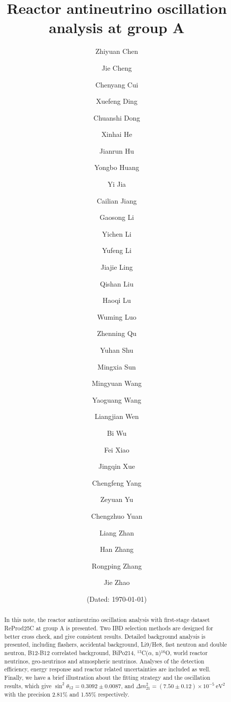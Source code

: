 \documentclass[12pt]{article}
\begin{document}
\linenumbers

\title{\textbf{Reactor antineutrino oscillation analysis at group A}}
\author[1]{Zhiyuan Chen}
\author[2]{Jie Cheng}
\author[1]{Chenyang Cui}
\author[1]{Xuefeng Ding}
\author[1]{Chuanshi Dong}
\author[1]{Xinhai He}
\author[3]{Jianrun Hu}
\author[4]{Yongbo Huang}
\author[1]{Yi Jia}
\author[1,5]{Cailian Jiang}
\author[1]{Gaosong Li}
\author[1]{Yichen Li}
\author[1]{Yufeng Li}
\author[3]{Jiajie Ling}
\author[1]{Qishan Liu}
\author[1]{Haoqi Lu}
\author[1]{Wuming Luo}
\author[1]{Zhenning Qu}
\author[1]{Yuhan Shu}
\author[1]{Mingxia Sun}
\author[1]{Mingyuan Wang}
\author[6]{Yaoguang Wang}
\author[1]{Liangjian Wen}
\author[3]{Bi Wu}
\author[1]{Fei Xiao}
\author[1]{Jingqin Xue}
\author[3]{Chengfeng Yang}
\author[1]{Zeyuan Yu}
\author[1]{Chengzhuo Yuan}
\author[1]{Liang Zhan}
\author[1]{Han Zhang}
\author[1]{Rongping Zhang}
\author[1]{Jie Zhao}
\renewcommand\Authands{ and }
\date{(Dated: \today)}
\maketitle

\begin{abstract}
In this note, the reactor antineutrino oscillation analysis with first-stage dataset ReProd25C at group A is presented. 
Two IBD selection methods are designed for better cross check, and give consistent results.
Detailed background analysis is presented, including flashers, accidental background, Li9/He8, fast neutron and double neutron, B12-B12 correlated background, BiPo214, $^{13}$C($\alpha$, n)$^{16}$O, world reactor neutrinos, geo-neutrinos and atmospheric neutrinos.
Analyses of the detection efficiency, energy response and reactor related uncertainties are included as well.
Finally, we have a brief illustration about the fitting strategy and the oscillation results, which give $\sin^2\theta_{12} = 0.3092 \pm 0.0087$, and $\Delta m_{21}^2 = (7.50 \pm 0.12) \times 10^{-5}~\mathrm{eV}^2$ with the precision 2.81\% and 1.55\% respectively.
\end{abstract}

\newpage
\tableofcontents

\newpage








\newpage


\end{document}
